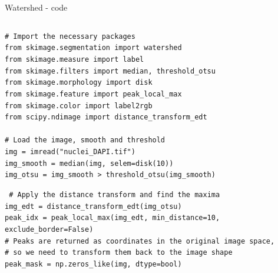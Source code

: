 \documentclass[9pt, aspectratio=169]{beamer}
\begin{document}
\begin{frame}
    {Watershed - code}
    \begin{columns}
        \begin{column}{.7\textwidth}
            {
                \begin{codebox}
                    \texttt{\# Import the necessary packages\\
                        from skimage.segmentation import watershed\\
                        from skimage.measure import label\\
                        from skimage.filters import median, threshold\_otsu\\
                        from skimage.morphology import disk\\
                        from skimage.feature import peak\_local\_max\\
                        from skimage.color import label2rgb\\
                        from scipy.ndimage import distance\_transform\_edt\\
                        \\
                        \pause
                        \# Load the image, smooth and threshold\\
                        img = imread("nuclei\_DAPI.tif")\\
                        img\_smooth = median(img, selem=disk(10))\\
                        img\_otsu = img\_smooth > threshold\_otsu(img\_smooth)
                    }
                \end{codebox}
            }
            {
                \begin{codebox}
                    \texttt{
                        \# Apply the distance transform and find the maxima\\
                        img\_edt = distance\_transform\_edt(img\_otsu)\\
                        peak\_idx = peak\_local\_max(img\_edt, min\_distance=10, exclude\_border=False)\\
                        \# Peaks are returned as coordinates in the original image space,\\
                        \#  so we need to transform them back to the image shape\\
                        peak\_mask = np.zeros\_like(img, dtype=bool)\\
}
\end{codebox}}
\end{column}
\end{columns}
\end{frame}
\end{document}
